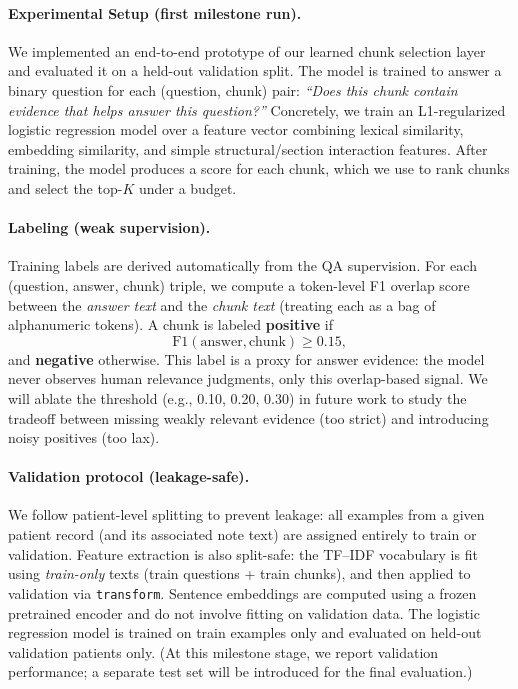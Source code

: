 \paragraph{Experimental Setup (first milestone run).}
We implemented an end-to-end prototype of our learned chunk selection layer and evaluated it on a held-out validation split. The model is trained to answer a binary question for each (question, chunk) pair: \emph{``Does this chunk contain evidence that helps answer this question?''} Concretely, we train an L1-regularized logistic regression model over a feature vector combining lexical similarity, embedding similarity, and simple structural/section interaction features. After training, the model produces a score for each chunk, which we use to rank chunks and select the top-$K$ under a budget.

\paragraph{Labeling (weak supervision).}
Training labels are derived automatically from the QA supervision. For each (question, answer, chunk) triple, we compute a token-level F1 overlap score between the \emph{answer text} and the \emph{chunk text} (treating each as a bag of alphanumeric tokens). A chunk is labeled \textbf{positive} if
\[
\mathrm{F1}(\text{answer}, \text{chunk}) \ge 0.15,
\]
and \textbf{negative} otherwise. This label is a proxy for answer evidence: the model never observes human relevance judgments, only this overlap-based signal. We will ablate the threshold (e.g., 0.10, 0.20, 0.30) in future work to study the tradeoff between missing weakly relevant evidence (too strict) and introducing noisy positives (too lax).

\paragraph{Validation protocol (leakage-safe).}
We follow patient-level splitting to prevent leakage: all examples from a given patient record (and its associated note text) are assigned entirely to train or validation. Feature extraction is also split-safe: the TF--IDF vocabulary is fit using \emph{train-only} texts (train questions + train chunks), and then applied to validation via \texttt{transform}. Sentence embeddings are computed using a frozen pretrained encoder and do not involve fitting on validation data. The logistic regression model is trained on train examples only and evaluated on held-out validation patients only. (At this milestone stage, we report validation performance; a separate test set will be introduced for the final evaluation.)

